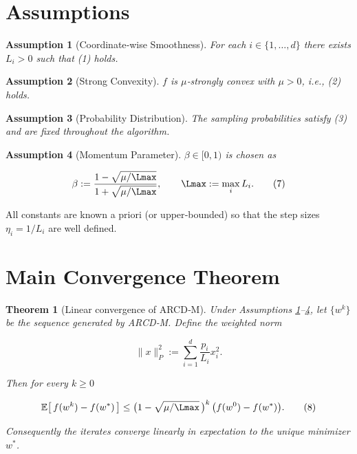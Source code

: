 \documentclass{article}
\newtheorem{theorem}{Theorem}
\newtheorem{assumption}{Assumption}
\newcommand{\E}{\mathbb{E}}
\begin{document}
\section*{Assumptions}
\begin{assumption}[Coordinate‑wise Smoothness]\label{as:smooth}
For each $i\in\{1,\dots ,d\}$ there exists $L_{i}>0$ such that (1) holds.
\end{assumption}
\begin{assumption}[Strong Convexity]\label{as:strong}
$f$ is $\mu$‑strongly convex with $\mu>0$, i.e., (2) holds.
\end{assumption}
\begin{assumption}[Probability Distribution]\label{as:prob}
The sampling probabilities satisfy (3) and are fixed throughout the
algorithm.
\end{assumption}
\begin{assumption}[Momentum Parameter]\label{as:beta}
$\beta\in[0,1)$ is chosen as  

\[
\beta:=\frac{1-\sqrt{\mu/\Lmax}}{1+\sqrt{\mu/\Lmax}},\qquad 
\Lmax:=\max_{i}L_{i}.
\tag{7}
\]
\end{assumption}
All constants are known a priori (or upper‑bounded) so that the step sizes
$\eta_{i}=1/L_{i}$ are well defined.

\section*{Main Convergence Theorem}
\begin{theorem}[Linear convergence of ARCD‑M]\label{thm:linear}
Under Assumptions \ref{as:smooth}–\ref{as:beta}, let $\{w^{k}\}$ be the
sequence generated by ARCD‑M.  Define the weighted norm  

\[
\|x\|_{P}^{2}:=\sum_{i=1}^{d}\frac{p_{i}}{L_{i}}x_{i}^{2}.
\]

Then for every $k\ge0$

\[
\E\!\left[\,f(w^{k})-f(w^{*})\,\right]\le
\bigl(1-\sqrt{\mu/\Lmax}\,\bigr)^{k}\,
\bigl(f(w^{0})-f(w^{*})\bigr).
\tag{8}
\]

Consequently the iterates converge linearly in expectation to the unique
minimizer $w^{*}$.
\end{theorem}

\end{document}
